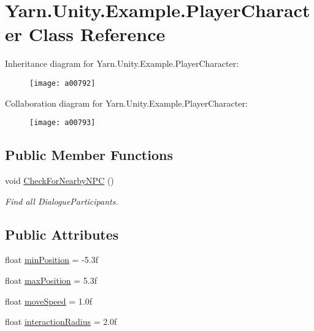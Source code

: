 \hypertarget{a00140}{\section{Yarn.\-Unity.\-Example.\-Player\-Character Class Reference}
\label{a00140}
}


Inheritance diagram for Yarn.\-Unity.\-Example.\-Player\-Character\-:
\nopagebreak
\begin{figure}[H]
\begin{center}
\leavevmode
\texttt{[image: a00792]}
\end{center}
\end{figure}


Collaboration diagram for Yarn.\-Unity.\-Example.\-Player\-Character\-:
\nopagebreak
\begin{figure}[H]
\begin{center}
\leavevmode
\texttt{[image: a00793]}
\end{center}
\end{figure}
\subsection*{Public Member Functions}
\begin{DoxyCompactItemize}
\item 
void \hyperlink{a00140_a574b6d984b8671c7a780d3d10e040a9b}{Check\-For\-Nearby\-N\-P\-C} ()
\begin{DoxyCompactList}\small\item\em Find all Dialogue\-Participants. \end{DoxyCompactList}\end{DoxyCompactItemize}
\subsection*{Public Attributes}
\begin{DoxyCompactItemize}
\item 
float \hyperlink{a00140_ac025d4f4afaf854f8256e0d2d03e5b52}{min\-Position} = -\/5.\-3f
\item 
float \hyperlink{a00140_ada9dd748a1d89a7f9b12ac8967a07ae6}{max\-Position} = 5.\-3f
\item 
float \hyperlink{a00140_adc602a4b2c7e44e4b15a11f1ffcf07e4}{move\-Speed} = 1.\-0f
\item 
float \hyperlink{a00140_af89807d2195915ee9a0c42317e110fc6}{interaction\-Radius} = 2.\-0f
\end{DoxyCompactItemize}
